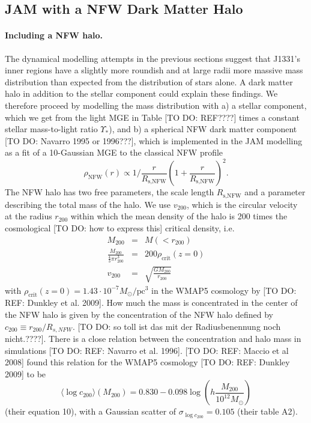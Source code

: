 \subsection{JAM with a NFW Dark Matter Halo}

\paragraph{Including a NFW halo.} The dynamical modelling attempts in the previous sections suggest that J1331's inner regions have a slightly more roundish and at large radii more massive mass distribution than expected from the distribution of stars alone. A dark matter halo in addition to the stellar component could explain these findings. We therefore proceed by modelling the mass distribution with a) a stellar component, which we get from the light MGE in Table [TO DO: REF????] times a constant stellar mass-to-light ratio $\Upsilon_*$), and b) a spherical NFW dark matter component [TO DO: Navarro 1995 or 1996???], which is implemented in the JAM modelling as a fit of a 10-Gaussian MGE to the classical NFW profile
\begin{equation*}
\rho_\text{NFW}(r) \propto 1 / \frac{r}{R_\text{s,NFW}} \left( 1 + \frac{r}{R_\text{s,NFW}} \right)^2.
\end{equation*}
The NFW halo has two free parameters, the scale length $R_\text{s,NFW}$ and a parameter describing the total mass of the halo. We use $v_\text{200}$, which is the circular velocity at the radius $r_\text{200}$ within which the mean density of the halo is 200 times the cosmological [TO DO: how to express this] critical density, i.e.
\begin{eqnarray*}
M_\text{200} &=& M(<r_{200})\\
\frac{M_{200}}{ \frac 43 \pi r_{200}^3} &=& 200 \rho_\text{crit}(z=0) \\
v_\text{200} &=& \sqrt{\frac{GM_{200}}{r_\text{200}}}
\end{eqnarray*}
with $\rho_\text{crit}(z=0)=1.43 \cdot 10^{-7} M_\odot / \text{pc}^3$ in the WMAP5 cosmology by [TO DO: REF: Dunkley et al. 2009]. How much the mass is concentrated in the center of the NFW halo is given by the concentration of the NFW halo defined by $c_{200}\equiv r_{200} / R_{s,NFW}$. [TO DO: so toll ist das mit der Radiusbenennung noch nicht.????]. There is a close relation between the concentration and halo mass in simulations [TO DO: REF: Navarro et al. 1996]. [TO DO: REF: Maccio et al 2008] found this relation for the WMAP5 cosmology [TO DO: REF: Dunkley 2009] to be
\begin{equation}
\langle \log c_{200} \rangle (M_{200}) = 0.830 - 0.098 \log \left(h \frac{M_{200}}{10^{12} M_\odot} \right) \label{eq:Maccio08}
\end{equation}
(their equation 10), with a Gaussian scatter of $\sigma_{\log c_{200}} = 0.105$ (their table A2).


